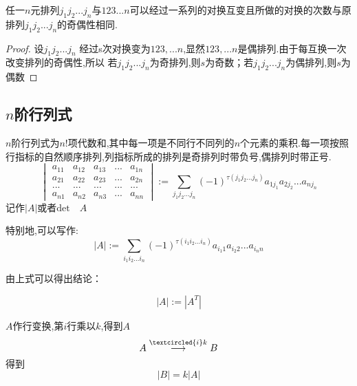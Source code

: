 \documentclass[blue,normal,cn]{elegantnote}
\begin{document}
\begin{theorem}
任一$n$元排列$j_1j_2...j_n$与$123...n$可以经过一系列的对换互变且所做的对换的次数与原排列$j_1j_2...j_n$的奇偶性相同.
\end{theorem}
\begin{proof}
设$j_1j_2...j_n$ 经过s次对换变为$123,...n$,显然$123,...n$是偶排列.由于每互换一次改变排列的奇偶性,所以
若$j_1j_2...j_n$为奇排列,则$s$为奇数；若$j_1j_2...j_n$为偶排列,则$s$为偶数
\end{proof}


\subsection{$n$阶行列式}

\begin{definition}[$n$阶行列式]
$n$阶行列式为$n!$项代数和,其中每一项是不同行不同列的$n$个元素的乘积.每一项按照行指标的自然顺序排列,列指标所成的排列是奇排列时带负号,偶排列时带正号.
\begin{equation*}
\begin{vmatrix} 
    a_{11}&a_{12} & a_{13} &...& a_{1n}\\
    a_{21}&a_{22} & a_{23} &...& a_{2n}\\
    ...&...&...&...&...\\
    a_{n1}&a_{n2} & a_{n3} &...& a_{nn}
\end{vmatrix}
:=\sum_{j_1j_2...j_n}(-1)^{\tau(j_1j_2...j_n)}a_{1j_1}a_{2j_2}...a_{nj_n}
\end{equation*}
记作$|A|$或者$\mathrm {det}\quad A$
\end{definition}

特别地,可以写作:
\begin{equation*}
|A|:=\sum_{i_1i_2...i_n}(-1)^{\tau(i_1 i_2...i_n)}a_{i_1 1}a_{i_2 2}...a_{i_n n}
\end{equation*}

由上式可以得出结论：
\begin{property}
\begin{equation*}
    |A|:=|A^T|
\end{equation*}
\end{property}

\begin{property}
$A$作行变换,第$i$行乘以$k$,得到$A$
    \begin{equation*}
        A\stackrel{\textcircled{i}k}{\longrightarrow}B
    \end{equation*}
得到
    \begin{equation*}
        |B|=k|A|
    \end{equation*}
\end{property}
\end{document}
